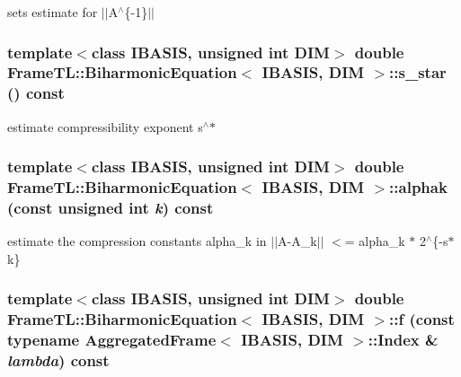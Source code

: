 sets estimate for $|$$|$A$^\wedge$\{-1\}$|$$|$ \hypertarget{classFrameTL_1_1BiharmonicEquation_c619e416f851afd5a307014a69cc6d35}{
\subsubsection[s\_\-star]{\setlength{\rightskip}{0pt plus 5cm}template$<$class IBASIS, unsigned int DIM$>$ double {\bf FrameTL::BiharmonicEquation}$<$ IBASIS, DIM $>$::s\_\-star () const}}
\label{classFrameTL_1_1BiharmonicEquation_c619e416f851afd5a307014a69cc6d35}


estimate compressibility exponent s$^\wedge$$\ast$ \hypertarget{classFrameTL_1_1BiharmonicEquation_9f424ae1bc3dbcc5490e6bd77240c71c}{
\subsubsection[alphak]{\setlength{\rightskip}{0pt plus 5cm}template$<$class IBASIS, unsigned int DIM$>$ double {\bf FrameTL::BiharmonicEquation}$<$ IBASIS, DIM $>$::alphak (const unsigned int {\em k}) const}}
\label{classFrameTL_1_1BiharmonicEquation_9f424ae1bc3dbcc5490e6bd77240c71c}


estimate the compression constants alpha\_\-k in $|$$|$A-A\_\-k$|$$|$ $<$= alpha\_\-k $\ast$ 2$^\wedge$\{-s$\ast$k\} \hypertarget{classFrameTL_1_1BiharmonicEquation_0b477b96020f82cbccb11d904acbaf3e}{
\subsubsection[f]{\setlength{\rightskip}{0pt plus 5cm}template$<$class IBASIS, unsigned int DIM$>$ double {\bf FrameTL::BiharmonicEquation}$<$ IBASIS, DIM $>$::f (const typename {\bf AggregatedFrame}$<$ IBASIS, DIM $>$::{\bf Index} \& {\em lambda}) const}}
\label{classFrameTL_1_1BiharmonicEquation_0b477b96020f82cbccb11d904acbaf3e}


